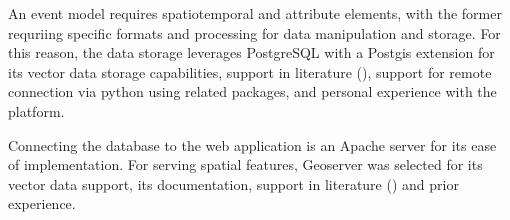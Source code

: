 An event model requires spatiotemporal and attribute elements, with the former requriing specific formats and processing for data manipulation and storage. For this reason, the data storage leverages PostgreSQL with a Postgis extension for its vector data storage capabilities, support in literature (\cite{Oliveira2021,Bhattacharya2018,Teitler2008,Sami2019}), support for remote connection via python using related packages, and personal experience with the platform. 


Connecting the database to the web application is an Apache server for its ease of implementation. For serving spatial features, Geoserver was selected for its vector data support, its documentation, support in literature (\cite{Bhattacharya2018,Jiang2020,Sami2019}) and prior experience. 



